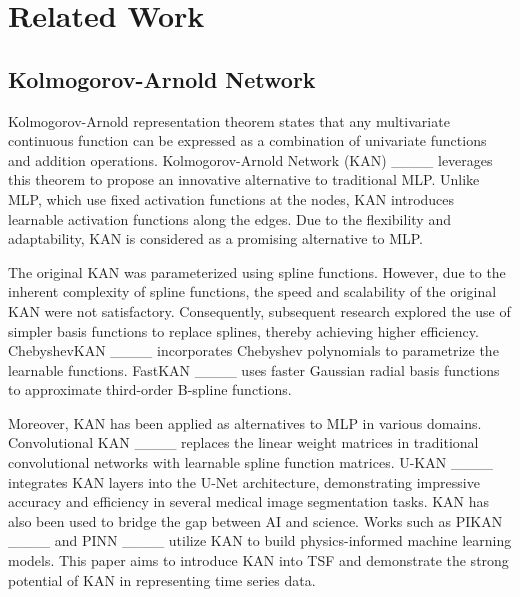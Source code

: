 \section{Related Work}
\subsection{Kolmogorov-Arnold Network}
Kolmogorov-Arnold representation theorem states that any multivariate continuous function can be expressed as a combination of univariate functions and addition operations. Kolmogorov-Arnold Network (KAN) ____ leverages this theorem to propose an innovative alternative to traditional MLP. Unlike MLP, which use fixed activation functions at the nodes, KAN introduces learnable activation functions along the edges. Due to the flexibility and adaptability, KAN is considered as a promising alternative to MLP.\par
The original KAN was parameterized using spline functions. However, due to the inherent complexity of spline functions, the speed and scalability of the original KAN were not satisfactory. Consequently, subsequent research explored the use of simpler basis functions to replace splines, thereby achieving higher efficiency. ChebyshevKAN ____ incorporates Chebyshev polynomials to parametrize the learnable functions. FastKAN ____ uses faster Gaussian radial basis functions to approximate third-order B-spline functions.\par 
Moreover, KAN has been applied as alternatives to MLP in various domains. Convolutional KAN ____ replaces the linear weight matrices in traditional convolutional networks with learnable spline function matrices. U-KAN ____ integrates KAN layers into the U-Net architecture, demonstrating impressive accuracy and efficiency in several medical image segmentation tasks. KAN has also been used to bridge the gap between AI and science. Works such as PIKAN ____ and PINN ____ utilize KAN to build physics-informed machine learning models. This paper aims to introduce KAN into TSF and demonstrate the strong potential of KAN in representing time series data.

